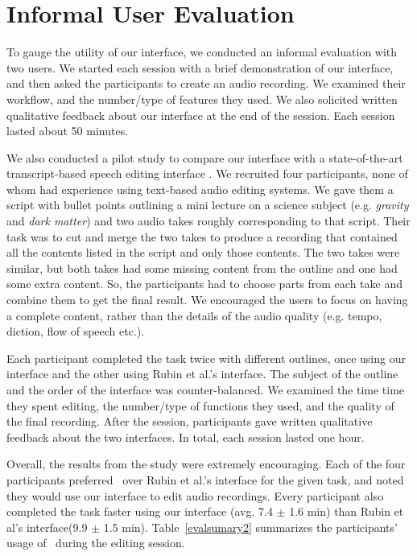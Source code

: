 \section{Informal User Evaluation}
To gauge the utility of our interface, we conducted an informal evaluation with two users. We started each session with a brief demonstration of our interface, and then asked the participants to create an audio recording. We examined their workflow, and the number/type of features they used. We also solicited written qualitative feedback about our interface at the end of the session. Each session lasted about 50 minutes.


We also conducted a pilot study to compare our interface with a state-of-the-art transcript-based speech editing interface \cite{rubin2013content}. We recruited four participants, none of whom had experience using text-based audio editing systems. We gave them a script with bullet points outlining a mini lecture on a science subject (e.g. \textit{gravity} and \textit{dark matter}) and two audio takes roughly corresponding to that script. Their task was to cut and merge the two takes to produce a recording that contained all the contents listed in the script and only those contents. The two takes were similar, but both takes had some
missing content from the outline and one had some extra
content. So, the participants had to choose parts from each take and combine them to get the final result. We encouraged the users to focus on having a complete content, rather than the details of the audio quality (e.g. tempo, diction, flow of speech etc.). 

Each participant completed the task twice with different outlines, once using our interface and the other using Rubin et al.'s interface. The subject of the outline and the order of the interface was counter-balanced. We examined the time time they spent editing, the number/type of functions they used, and the quality of the final recording. After the session, participants gave written qualitative feedback about the two interfaces. In total, each session lasted one hour.
   
Overall, the results from the study were extremely encouraging. Each of the four participants preferred \systemname\ over Rubin et al.'s interface for the given task, and noted they would use our interface to edit audio recordings. Every participant also completed the task faster using our interface (avg. 7.4 $\pm$ 1.6 min) than Rubin et al's interface(9.9 $\pm$ 1.5 min). Table~\ref{evalsumary2} summarizes the participants' usage of \systemname\ during the editing session.


